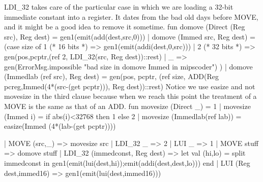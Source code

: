 \indent \code{}LDI_32\edoc{} takes care of the particular case in which we are 
loading a 32-bit immediate constant into a register.  
It dates from the bad old days before \code{}MOVE\edoc{}, and it might be a good idea
to remove it sometime.
\enddocs
{}
\endmoddef
fun domove (Direct (Reg src), Reg dest) = gen1(emit(add(dest,src,0)))
  | domove (Immed src, Reg dest) =
        (case size of
            1 (* 16 bits *) => gen1(emit(addi(dest,0,src)))
          | 2 (* 32 bits *) => 
                        gen(pos,pcptr,(ref 2, LDI_32(src, Reg dest))::rest)
          | _ => gen(ErrorMsg.impossible "bad size in domove Immed in mipscoder")
        )
  | domove (Immedlab (ref src), Reg dest) =
        gen(pos, pcptr, 
              (ref size, 
                    ADD(Reg pcreg,Immed(4*(src-(get pcptr))), Reg dest))::rest)
\endcode
{}
Notice we use \code{}easize\edoc{} and not \code{}movesize\edoc{} in the third clause
because when we reach this point the treatment of a \code{}MOVE\edoc{} is the same
as that of an \code{}ADD\edoc{}.
\enddocs
{}
\endmoddef
fun movesize (Direct _) = 1
  | movesize (Immed i) = if abs(i)<32768 then 1 else 2
  | movesize (Immedlab(ref lab)) = easize(Immed (4*(lab-(get pcptr))))

\endcode
{}
\endmoddef
| MOVE (src,_) => movesize src
| LDI_32 _ => 2
| LUI _ => 1
\endcode
{}
\endmoddef
| MOVE stuff => domove stuff
| LDI_32 (immedconst, Reg dest) =>
         let val (hi,lo) = split immedconst
         in  gen1(emit(lui(dest,hi));emit(addi(dest,dest,lo)))
         end 
| LUI (Reg dest,immed16) => gen1(emit(lui(dest,immed16)))

\endcode
{}


